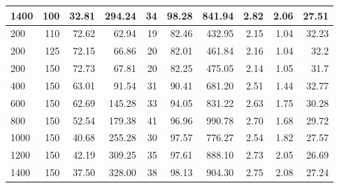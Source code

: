 \begin{table}[h]
{{\begin{tabular}{lrrrrrrrrr}
                1400       & 100                  & 32.81             & 294.24          & 34       & 98.28          & 841.94                     & 2.82      & 2.06              & 27.51                    \\
                \hline
                200        & 110                  & 72.62             & 62.94           & 19       & 82.46          & 432.95                     & 2.15      & 1.04              & 32.23                    \\
                200        & 125                  & 72.15             & 66.86           & 20       & 82.01          & 461.84                     & 2.16      & 1.04              & 32.2                     \\
                \hline
                200        & 150                  & 72.73             & 67.81           & 20       & 82.25          & 475.05                     & 2.14      & 1.05              & 31.7                     \\
                400        & 150                  & 63.01             & 91.54           & 31       & 90.41          & 681.20                     & 2.51      & 1.44              & 32.77                    \\
                600        & 150                  & 62.69             & 145.28          & 33       & 94.05          & 831.22                     & 2.63      & 1.75              & 30.28                    \\
                800        & 150                  & 52.54             & 179.38          & 41       & 96.96          & 990.78                     & 2.70      & 1.68              & 29.72                    \\
                1000       & 150                  & 40.68             & 255.28          & 30       & 97.57          & 776.27                     & 2.54      & 1.82              & 27.57                    \\
                1200       & 150                  & 42.19             & 309.25          & 35       & 97.61          & 888.10                     & 2.73      & 2.05              & 26.69                    \\
                1400       & 150                  & 37.50             & 328.00          & 38       & 98.13          & 904.30                     & 2.75      & 2.08              & 27.24                    \\
                \bottomrule
            \end{tabular}
        }
    }
\end{table}
